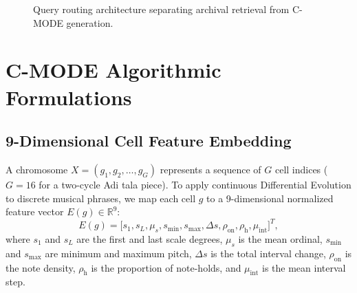 \documentclass[12pt,a4paper]{report}
\begin{document}
\begin{figure}[h!]
\centering
{}
\caption{Query routing architecture separating archival retrieval from C-MODE generation.}
\label{fig:router}
\end{figure}

\chapter{C-MODE Algorithmic Formulations}

\section{9-Dimensional Cell Feature Embedding}
A chromosome $X = (g_1, g_2, \dots, g_G)$ represents a sequence of $G$ cell indices ($G=16$ for a two-cycle Adi tala piece). To apply continuous Differential Evolution to discrete musical phrases, we map each cell $g$ to a 9-dimensional normalized feature vector $E(g) \in \mathbb{R}^9$:
\begin{equation}
 E(g) = \big[ s_1, s_L, \mu_s, s_{\min}, s_{\max}, \Delta s, \rho_{\text{on}}, \rho_{\text{h}}, \mu_{\text{int}} \big]^T,
\end{equation}
where $s_1$ and $s_L$ are the first and last scale degrees, $\mu_s$ is the mean ordinal, $s_{\min}$ and $s_{\max}$ are minimum and maximum pitch, $\Delta s$ is the total interval change, $\rho_{\text{on}}$ is the note density, $\rho_{\text{h}}$ is the proportion of note-holds, and $\mu_{\text{int}}$ is the mean interval step.
\end{document}
